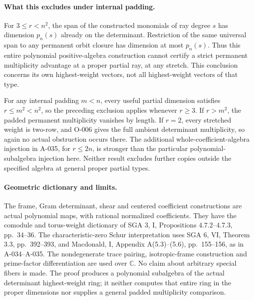 \paragraph{What this excludes under internal padding.}
For \(3\leq r<n^2\), the span of the constructed
monomials of ray degree \(s\) has dimension \(p_n(s)\)
already on the determinant. Restriction of the same
universal span to any permanent orbit closure has
dimension at most \(p_n(s)\). Thus this entire
polynomial positive-algebra construction cannot
certify a strict permanent multiplicity advantage
at a proper partial ray, at any stretch.
This conclusion concerns its own highest-weight
vectors, not all highest-weight vectors of that
type.

For any internal padding \(m<n\), every useful
partial dimension satisfies \(r\leq m^2<n^2\),
so the preceding exclusion applies whenever
\(r\geq3\). If \(r>m^2\), the padded permanent
multiplicity vanishes by length. If \(r=2\),
every stretched weight is two-row, and O-006 gives
the full ambient determinant multiplicity, so
again no actual obstruction occurs there.
The additional whole-coefficient-algebra injection
in A-035, for \(r\leq2n\), is stronger than the
particular polynomial-subalgebra injection here.
Neither result excludes further copies outside
the specified algebra at general proper partial
types.

\paragraph{Geometric dictionary and limits.}
The frame, Gram determinant, shear and centered
coefficient constructions are actual polynomial
maps, with rational normalized coefficients.
They have the comodule and torus-weight dictionary
of SGA 3, I, Propositions 4.7.2--4.7.3,
pp.~34--36. The characteristic-zero Schur
interpretation uses SGA 6, VI, Theorem 3.3,
pp.~392--393, and Macdonald, I, Appendix
A(5.3)--(5.6), pp.~155--156, as in A-034--A-035.
The nondegenerate trace pairing, isotropic-frame
construction and prime-factor differentiation are
used over \(\mathbb C\). No claim about arbitrary
special fibers is made.
The proof produces a polynomial subalgebra of the
actual determinant highest-weight ring; it neither
computes that entire ring in the proper dimensions
nor supplies a general padded multiplicity comparison.

